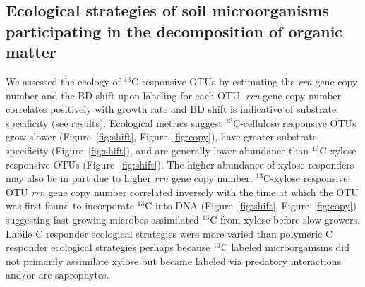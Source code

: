 \subsection{Ecological strategies of soil microorganisms participating in the
decomposition of organic matter}
We assessed the ecology of $^{13}$C-responsive OTUs by estimating the
\textit{rrn} gene copy number and the BD shift upon labeling for each OTU.
\textit{rrn} gene copy number correlates positively with growth rate
\citep{11125085} and BD shift is indicative of substrate specificity (see
results). Ecological metrics suggest $^{13}$C-cellulose responsive OTUs grow
slower (Figure~\ref{fig:shift}, Figure~\ref{fig:copy}), have greater substrate
specificity (Figure~\ref{fig:shift}), and are generally lower abundance than
$^{13}$C-xylose responsive OTUs (Figure~\ref{fig:shift}). The higher abundance
of xylose responders may also be in part due to higher \textit{rrn} gene copy
number. $^{13}$C-xylose responsive OTU \textit{rrn} gene copy number correlated
inversely with the time at which the OTU was first found to incorporate
$^{13}$C into DNA (Figure~\ref{fig:shift}, Figure~\ref{fig:copy}) suggesting
fast-growing microbes assimilated $^{13}$C from xylose before slow growers.
Labile C responder ecological strategies were more varied than polymeric
C responder ecological strategies perhaps because $^{13}$C labeled
microorganisms did not primarily assimilate xylose but became labeled via
predatory interactions and/or are saprophytes. 

